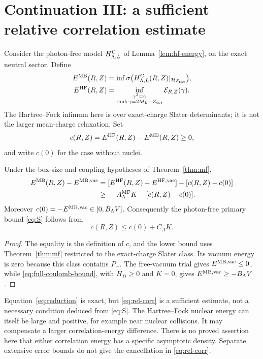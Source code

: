 \section{Continuation III: a sufficient relative correlation estimate}
\label{sec:reduction}

Consider the photon-free model \(H^{\rm C}_{\Lambda,L}\) of
Lemma~\ref{lem:hf-energy}, on the exact neutral sector. Define
\begin{align*}
E^{\rm MB}(R,Z)
&=\inf\sigma\bigl(H^{\rm C}_{\Lambda,L}(R,Z)|_{\mathcal H_{Z_{\rm tot}}}\bigr),\\
E^{\rm HF}(R,Z)
&=\inf_{\substack{\gamma^2=\gamma\\
\operatorname{rank}\gamma=2M_L+Z_{\rm tot}}}\mathcal E_{R,Z}(\gamma).
\end{align*}
The Hartree--Fock infimum here is over exact-charge Slater determinants;
it is not the larger mean-charge relaxation. Set
\begin{equation}
c(R,Z)=E^{\rm HF}(R,Z)-E^{\rm MB}(R,Z)\ge0,
\end{equation}
and write \(c(0)\) for the case without nuclei.

\begin{proposition}
\label{prop:reduction}
Under the box-size and coupling hypotheses of Theorem~\ref{thm:mf},
\begin{align}
E^{\rm MB}(R,Z)-E^{\rm MB,\mathrm{vac}}
={}&[E^{\rm HF}(R,Z)-E^{\rm HF,\mathrm{vac}}]
-[c(R,Z)-c(0)]
\nonumber\\
\ge{}&-A^{\rm MF}_\Lambda K-[c(R,Z)-c(0)].
\label{eq:reduction}
\end{align}
Moreover \(c(0)=-E^{\rm MB,\mathrm{vac}}\in[0,B_\Lambda V]\).
Consequently the photon-free primary bound \eqref{eq:S} follows from
\begin{equation}
c(R,Z)\le c(0)+C_\Lambda K.
\label{eq:rel-corr}
\end{equation}
\end{proposition}
\begin{proof}
The equality is the definition of \(c\), and the lower bound uses
Theorem~\ref{thm:mf} restricted to the exact-charge Slater class.
Its vacuum energy is zero because this class contains \(P_-\).
The free-vacuum trial gives \(E^{\rm MB,\mathrm{vac}}\le0\), while
\eqref{eq:full-coulomb-bound}, with \(H_D\ge0\) and \(K=0\), gives
\(E^{\rm MB,\mathrm{vac}}\ge-B_\Lambda V\).
\end{proof}

\begin{remark}
Equation~\eqref{eq:reduction} is exact, but
\eqref{eq:rel-corr} is a sufficient estimate, not a necessary condition
deduced from \eqref{eq:S}. The Hartree--Fock nuclear energy can itself be
large and positive, for example near nuclear collisions. It may compensate
a larger correlation-energy difference. There is no proved assertion here
that either correlation energy has a specific asymptotic density.
Separate extensive error bounds do not give the cancellation in
\eqref{eq:rel-corr}.
\end{remark}

